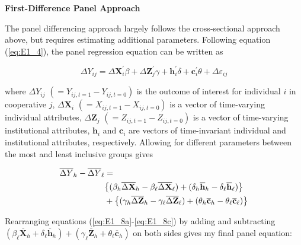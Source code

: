 \documentclass[11pt]{article}
\begin{document}
\noindent \textbf{First-Difference Panel Approach}

The panel differencing approach largely follows the cross-sectional approach above, but requires estimating additional parameters. Following equation (\ref{eq:E1_4}), the panel regression equation can be written as

\begin{equation} \label{eq:E1_7}
   \Delta Y_{ij} = \Delta \mathbf{X}_i^{\prime}\beta + \Delta \mathbf{Z}_j^{\prime}\gamma + \mathbf{h}_i^{\prime}\delta + \mathbf{c}_i^{\prime}\theta + \Delta \varepsilon_{ij}
\end{equation}  

where $\Delta Y_{ij}$ $(= Y_{ij,t=1} - Y_{ij,t=0})$ is the outcome of interest for individual $i$ in cooperative $j$, $\Delta \mathbf{X}_i$ $(= X_{ij,t=1} - X_{ij,t=0})$ is a vector of time-varying individual attributes, $\Delta \mathbf{Z}_j$ $(= Z_{ij,t=1} - Z_{ij,t=0})$ is a vector of time-varying institutional attributes, $\mathbf{h}_i$ and $\mathbf{c}_i$ are vectors of time-invariant individual and institutional attributes, respectively. Allowing for different parameters between the most and least inclusive groups gives

\begin{subequations}
    \begin{align}
        \overline{\Delta Y}_{h} - \overline{\Delta Y}_{\ell} &= \label{eq:E1_8a} \\ 
        &\big{\{}(\beta_{h}\overline{\Delta \mathbf{X}}_{h} - \beta_{\ell}\overline{\Delta \mathbf{X}}_{\ell}) + (\delta_{h}\overline{\mathbf{h}}_{h} - \delta_{\ell}\overline{\mathbf{h}}_{\ell}) \big{\}} \label{eq:E1_8b} \\ 
        &+ \big{\{}(\gamma_{h}\overline{\Delta \mathbf{Z}}_{h} - \gamma_{\ell}\overline{\Delta \mathbf{Z}}_{\ell}) + (\theta_{h}\overline{\mathbf{c}}_{h} - \theta_{\ell}\overline{\mathbf{c}}_{\ell}) \big{\}} \label{eq:E1_8c}
    \end{align}
\end{subequations}  

Rearranging equations (\ref{eq:E1_8a}-\ref{eq:E1_8c}) by adding and subtracting $(\beta_{\ell}\overline{\mathbf{X}}_{h} + \delta_{\ell}\overline{\mathbf{h}}_{h}) + (\gamma_{\ell}\overline{\mathbf{Z}}_{h} + \theta_{\ell}\overline{\mathbf{c}}_{h})$ on both sides gives my final panel equation:
\end{document}
